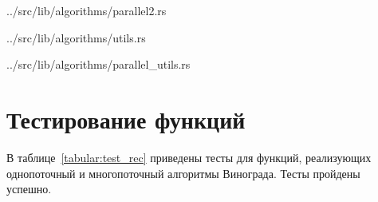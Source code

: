 \begin{lstinputlisting}[
	caption={Параллельный алгоритм Винограда 2},
	label={lst:parallel2},
	style={rust},
	linerange={3-15}
]{../src/lib/algorithms/parallel2.rs}
\end{lstinputlisting}

\begin{lstinputlisting}[
	caption={Вспомогательные однопоточные функции},
	label={lst:utils},
	style={rust},
	linerange={6-36}
]{../src/lib/algorithms/utils.rs}
\end{lstinputlisting}

\begin{lstinputlisting}[
	caption={Вспомогательные многопоточные функции},
	label={lst:parallel_utils},
	style={rust},
]{../src/lib/algorithms/parallel_utils.rs}
\end{lstinputlisting}

\section{Тестирование функций}

В таблице~\ref{tabular:test_rec} приведены тесты для функций, реализующих однопоточный и многопоточный алгоритмы Винограда. Тесты пройдены успешно.

